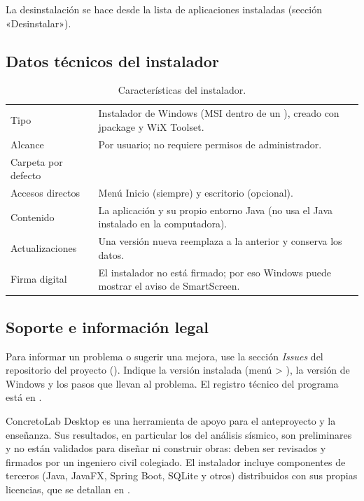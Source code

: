 \begin{anexo}
La desinstalación se hace desde la lista de aplicaciones instaladas (sección «Desinstalar»).

\subsection{Datos técnicos del instalador}

\begin{table}[H]
	\centering
	\caption{Características del instalador.}
	\label{tab:instalador}
	\begin{tabular}{L{4.6cm}L{9.2cm}}
		\hline
		Tipo & Instalador de Windows (MSI dentro de un ), creado con jpackage y WiX Toolset. \\
		Alcance & Por usuario; no requiere permisos de administrador. \\
		Carpeta por defecto &  \\
		Accesos directos & Menú Inicio (siempre) y escritorio (opcional). \\
		Contenido & La aplicación y su propio entorno Java (no usa el Java instalado en la computadora). \\
		Actualizaciones & Una versión nueva reemplaza a la anterior y conserva los datos. \\
		Firma digital & El instalador no está firmado; por eso Windows puede mostrar el aviso de SmartScreen. \\ \hline
	\end{tabular}
\end{table}

\subsection{Soporte e información legal}

Para informar un problema o sugerir una mejora, use la sección \textit{Issues} del repositorio del proyecto
(\href{\repositorioweb/issues}{}). Indique la versión instalada (menú 
\textgreater{} ), la versión de Windows y los pasos que llevan al problema. El registro técnico
del programa está en .

ConcretoLab Desktop es una herramienta de apoyo para el anteproyecto y la enseñanza. Sus resultados, en particular los
del análisis sísmico, son preliminares y no están validados para diseñar ni construir obras: deben ser revisados y
firmados por un ingeniero civil colegiado. El instalador incluye componentes de terceros (Java, JavaFX, Spring Boot,
SQLite y otros) distribuidos con sus propias licencias, que se detallan en .
\end{anexo}
